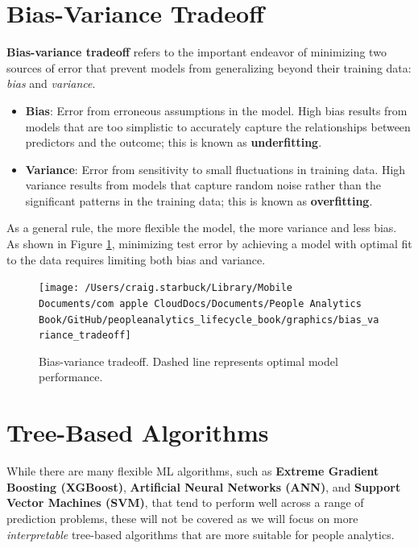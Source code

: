 \documentclass[
]{book}
\providecommand{\tightlist}{%
  \setlength{\itemsep}{0pt}\setlength{\parskip}{0pt}}
\begin{document}
\hypertarget{bias-variance-tradeoff}{%
\section{Bias-Variance Tradeoff}\label{bias-variance-tradeoff}}

\textbf{Bias-variance tradeoff} refers to the important endeavor of minimizing two sources of error that prevent models from generalizing beyond their training data: \emph{bias} and \emph{variance}.

\begin{itemize}
\tightlist
\item
  \textbf{Bias}: Error from erroneous assumptions in the model. High bias results from models that are too simplistic to accurately capture the relationships between predictors and the outcome; this is known as \textbf{underfitting}.
\item
  \textbf{Variance}: Error from sensitivity to small fluctuations in training data. High variance results from models that capture random noise rather than the significant patterns in the training data; this is known as \textbf{overfitting}.
\end{itemize}

As a general rule, the more flexible the model, the more variance and less bias. As shown in Figure \ref{fig:bias-var-tradeoff}, minimizing test error by achieving a model with optimal fit to the data requires limiting both bias and variance.

\begin{figure}

{\centering \texttt{[image: /Users/craig.starbuck/Library/Mobile Documents/com~apple~CloudDocs/Documents/People Analytics Book/GitHub/peopleanalytics\_lifecycle\_book/graphics/bias\_variance\_tradeoff]} 

}

\caption{Bias-variance tradeoff. Dashed line represents optimal model performance.}\label{fig:bias-var-tradeoff}
\end{figure}

\hypertarget{tree-based-algorithms}{%
\section{Tree-Based Algorithms}\label{tree-based-algorithms}}

While there are many flexible ML algorithms, such as \textbf{Extreme Gradient Boosting (XGBoost)}, \textbf{Artificial Neural Networks (ANN)}, and \textbf{Support Vector Machines (SVM)}, that tend to perform well across a range of prediction problems, these will not be covered as we will focus on more \emph{interpretable} tree-based algorithms that are more suitable for people analytics.
\end{document}
